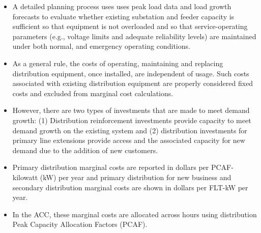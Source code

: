 \documentclass[11pt]{article}
\begin{document}
\begin{itemize}



\item A detailed planning process uses uses peak load data and load growth forecasts to evaluate whether existing substation and feeder capacity is sufficient so that equipment is not overloaded and so that  service-operating parameters (e.g., voltage limits and adequate reliability levels) are maintained under both normal, and emergency operating conditions.

\item As a general rule, the costs of operating, maintaining and replacing distribution equipment, once installed, are independent of usage. Such costs associated with existing distribution equipment are properly considered fixed costs and excluded from marginal cost calculations.

\item However, there are two types of investments that are made to meet demand growth: (1) Distribution reinforcement investments provide capacity  to meet demand growth on the existing system and (2) distribution investments for primary line extensions provide access and the associated capacity for new demand due to the addition of new customers. 


\item Primary distribution marginal costs are reported  in dollars per PCAF-kilowatt (kW) per year and primary distribution for new  business and secondary distribution marginal costs are shown in dollars per FLT-kW per year.  

\item In the ACC, these marginal costs are allocated across hours using distribution Peak Capacity Allocation Factors (PCAF). 

\end{itemize}
\end{document}
